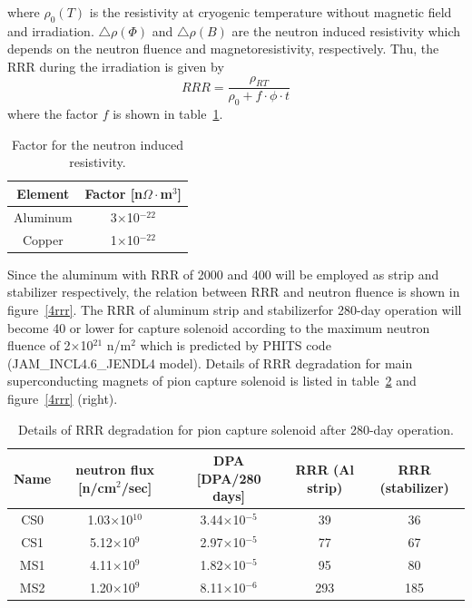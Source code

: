 where $\rho_0(T)$ is the resistivity at cryogenic temperature without magnetic field and irradiation.
$\bigtriangleup \rho(\Phi)$ and $\bigtriangleup \rho(B)$ are the neutron induced resistivity which depends on the neutron fluence and magnetoresistivity, respectively.
Thu, the RRR during the irradiation is given by
\begin{equation}
 RRR = \frac{\rho_{RT}}{\rho_0 + f \cdot \phi \cdot t}
\end{equation}
where the factor $f$ is shown in table~\ref{factorirr}.
\begin{table}[H]
 \centering
 \begin{tabular}{cc} \hline \hline
  Element & Factor [n$\Omega\cdot$m$^3$] \\ \hline
  Aluminum & 3$\times$10$^{-22}$ \\
  Copper & 1$\times$10$^{-22}$ \\ \hline \hline
 \end{tabular}
 \caption{Factor for the neutron induced resistivity.}
 \label{factorirr}
\end{table}
Since the aluminum with RRR of 2000 and 400 will be employed as strip and stabilizer respectively, the relation between RRR and neutron fluence is shown in figure~\ref{4rrr}.
The RRR of aluminum strip and stabilizerfor 280-day operation will become 40 or lower for capture solenoid according to the maximum neutron fluence of 2$\times$10$^{21}$ n/m$^2$ which is predicted by PHITS code (JAM\_INCL4.6\_JENDL4 model).
Details of RRR degradation for main superconducting magnets of pion capture solenoid is listed in table~\ref{RRRdeg} and figure~\ref{4rrr} (right).
\begin{table}[H]
 \centering
 \begin{tabular}{ccccc} \hline \hline
  Name & neutron flux [n/cm$^2$/sec] & DPA [DPA/280 days] & RRR (Al strip) & RRR (stabilizer) \\ \hline
  CS0 & 1.03$\times$10$^{10}$ & 3.44$\times$10$^{-5}$ & 39 & 36 \\
  CS1 & 5.12$\times$10$^{9}$ & 2.97$\times$10$^{-5}$ & 77 & 67 \\
  MS1 & 4.11$\times$10$^{9}$ & 1.82$\times$10$^{-5}$ & 95 & 80 \\
  MS2 & 1.20$\times$10$^{9}$ & 8.11$\times$10$^{-6}$ & 293 & 185 \\ \hline \hline
 \end{tabular}
 \caption{Details of RRR degradation for pion capture solenoid after 280-day operation.}
 \label{RRRdeg}
\end{table}


